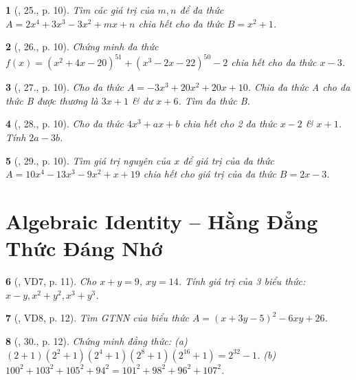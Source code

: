 \documentclass{article}
\newtheorem{baitoan}{}
\begin{document}
\begin{baitoan}[\cite{Tuyen_Toan_8}, 25., p. 10]
	Tìm các giá trị của $m,n$ để đa thức $A = 2x^4 + 3x^3 - 3x^2 + mx + n$ chia hết cho đa thức $B = x^2 + 1$.
\end{baitoan}

\begin{baitoan}[\cite{Tuyen_Toan_8}, 26., p. 10]
	Chứng minh đa thức $f(x) = (x^2 + 4x - 20)^{51} + (x^3 - 2x - 22)^{50} - 2$ chia hết cho đa thức $x - 3$.
\end{baitoan}

\begin{baitoan}[\cite{Tuyen_Toan_8}, 27., p. 10]
	Cho đa thức $A = -3x^3 + 20x^2 + 20x + 10$. Chia đa thức A cho đa thức B được thương là $3x + 1$ \& dư $x + 6$. Tìm đa thức B.
\end{baitoan}

\begin{baitoan}[\cite{Tuyen_Toan_8}, 28., p. 10]
	Cho đa thức $4x^3 + ax + b$ chia hết cho 2 đa thức $x - 2$ \& $x + 1$. Tính $2a - 3b$.
\end{baitoan}

\begin{baitoan}[\cite{Tuyen_Toan_8}, 29., p. 10]
	Tìm giá trị nguyên của $x$ để giá trị của đa thức $A = 10x^4 - 13x^3 - 9x^2 + x + 19$ chia hết cho giá trị của đa thức $B = 2x - 3$.
\end{baitoan}


\section{Algebraic Identity -- Hằng Đẳng Thức Đáng Nhớ}

\begin{baitoan}[\cite{Tuyen_Toan_8}, VD7, p. 11]
	Cho $x + y = 9$, $xy = 14$. Tính giá trị của 3 biểu thức: $x - y,x^2 + y^2,x^3 + y^3$.
\end{baitoan}

\begin{baitoan}[\cite{Tuyen_Toan_8}, VD8, p. 12]
	Tìm {\rm GTNN} của biểu thức $A = (x + 3y - 5)^2 - 6xy + 26$.
\end{baitoan}

\begin{baitoan}[\cite{Tuyen_Toan_8}, 30., p. 12]
	Chứng minh đẳng thức: (a) $(2 + 1)(2^2 + 1)(2^4 + 1)(2^8 + 1)(2^{16} + 1) = 2^{32} - 1$. (b) $100^2 + 103^2 + 105^2 + 94^2 = 101^2 + 98^2 + 96^2 + 107^2$.
\end{baitoan}
\end{document}
